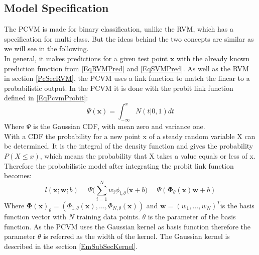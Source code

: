 \subsection{Model Specification}\label{PcSecCM}
The \acs{PCVM} is made for binary classification\cite{Chen.2009}, unlike the \acs{RVM}, which has a specification for multi class.\cite[p. 220]{Tipping.2001} But the ideas behind the two concepts are similar as we will see in the following.\\
In general, it makes predictions for a given test point $\mathbf{x}$ with the already known prediction function from \eqref{EqRVMPred} and \eqref{EqSVMPred}.\cite{Chen.2009}
As well as the \acs{RVM} in section \ref{PcSecRVM}, the \acs{PCVM} uses a link function to match the linear to a probabilistic output.
In the PCVM it is done with the probit link function defined in \ref{EqPcvmProbit}:\cite{Chen.2014}
\begin{equation}\label{EqPcvmProbit}
	\Psi(\mathbf{x}) = \int_{-\infty}^{x}N(t\vert 0,1)dt
\end{equation}
Where $\Psi$ is the Gaussian \ac{CDF}, with mean zero and variance one.\\
With a \ac{CDF} the probability for a new point x of a steady random variable X can be determined.
It is the integral of the density function and gives the probability $P(X \le x)$, which means the probability that X takes a value equals or less of x.\cite[p. 270]{Teschl.2014}\\
Therefore the probabilistic model after integrating the probit link function becomes:
\begin{equation}
	l(\mathbf{x};\mathbf{w};b) = \Psi\bigg(\sum_{i=1}^{N}w_i\phi_{i,\theta}(\mathbf{x}+b \bigg) = \Psi(\boldsymbol{\Phi}_\theta(\mathbf{x})\mathbf{w}+b)
\end{equation}
Where $\boldsymbol{\Phi(\mathbf{x})}_\theta=(\Phi_{1,\theta}(\mathbf{x}),\dots,\Phi_{N,\theta}(\mathbf{x}))$ and $\mathbf{w} = (w_1,\dots,w_N)^T$is the basis function vector with $N$ training data points.
$\theta$ is the parameter of the basis function. As the \ac{PCVM} uses the Gaussian kernel as basis function therefore the parameter $\theta$ is referred as the width of the kernel.\cite{Chen.2009}
The Gaussian kernel is described in the section \ref{EmSubSecKernel}.
